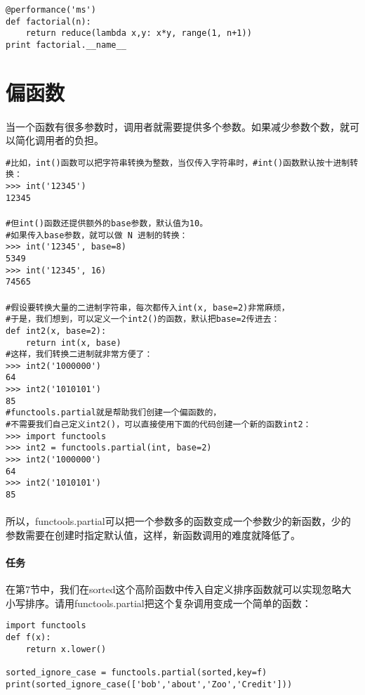 \documentclass{article}
\begin{document}
\begin{CJK}{UTF8}{gbsn}
\begin{verbatim}
@performance('ms')
def factorial(n):
    return reduce(lambda x,y: x*y, range(1, n+1))
print factorial.__name__
\end{verbatim}
\section{偏函数}
\paragraph{}
当一个函数有很多参数时，调用者就需要提供多个参数。如果减少参数个数，就可以简化调用者的负担。
\begin{verbatim}
#比如，int()函数可以把字符串转换为整数，当仅传入字符串时，#int()函数默认按十进制转换：
>>> int('12345')
12345
\end{verbatim}
\paragraph{}
\begin{verbatim}
#但int()函数还提供额外的base参数，默认值为10。
#如果传入base参数，就可以做 N 进制的转换：
>>> int('12345', base=8)
5349
>>> int('12345', 16)
74565
\end{verbatim}
\paragraph{}
\begin{verbatim}
#假设要转换大量的二进制字符串，每次都传入int(x, base=2)非常麻烦，
#于是，我们想到，可以定义一个int2()的函数，默认把base=2传进去：
def int2(x, base=2):
    return int(x, base)
#这样，我们转换二进制就非常方便了：
>>> int2('1000000')
64
>>> int2('1010101')
85
#functools.partial就是帮助我们创建一个偏函数的，
#不需要我们自己定义int2()，可以直接使用下面的代码创建一个新的函数int2：
>>> import functools
>>> int2 = functools.partial(int, base=2)
>>> int2('1000000')
64
>>> int2('1010101')
85
\end{verbatim}
\paragraph{}
所以，functools.partial可以把一个参数多的函数变成一个参数少的新函数，少的参数需要在创建时指定默认值，这样，新函数调用的难度就降低了。
\paragraph{任务}
在第7节中，我们在sorted这个高阶函数中传入自定义排序函数就可以实现忽略大小写排序。请用functools.partial把这个复杂调用变成一个简单的函数：
\begin{verbatim}
import functools
def f(x):
    return x.lower()
    
sorted_ignore_case = functools.partial(sorted,key=f)
print(sorted_ignore_case(['bob','about','Zoo','Credit']))
\end{verbatim}
\end{CJK}
\end{document}
